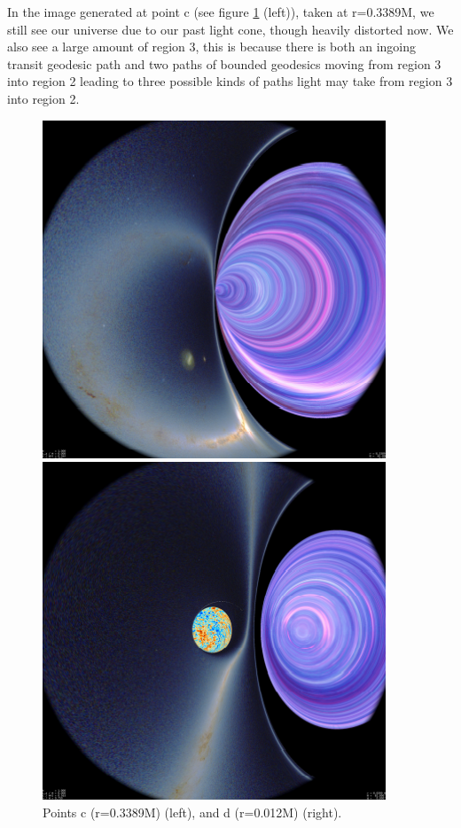 \documentclass[oneside,openright,frontopenright, singlespacing]{dmathesis}
\begin{document}
\vspace{1em}
	In the image generated at point c (see figure \ref{fig:Figure6.5} (left)), taken at r=0.3389M, we still see our universe due to our past light cone, though heavily distorted now. We also see a large amount of region 3, this is because there is both an ingoing transit geodesic path and two paths of bounded geodesics moving from region 3 into region 2 leading to three possible kinds of paths light may take from region 3 into region 2.

\vspace{1em}
\begin{figure}[!ht]
	\centering
	\begin{minipage}{0.5\textwidth}
		\centering
		\includegraphics[width=0.75\linewidth]{img/plunging3}
	\end{minipage}%
	\hfill
	\begin{minipage}{0.5\textwidth}
		\centering
		\includegraphics[width=0.75\linewidth]{img/plunging4}
	\end{minipage}
	\caption{Points c (r=0.3389M) (left), and d (r=0.012M) (right).}
	\label{fig:Figure6.5}
\end{figure}
\end{document}

